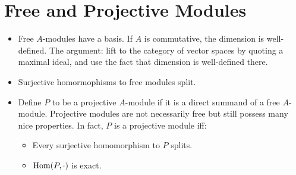 \section{Free and Projective Modules}
\begin{itemize}
    \item Free $A$-modules have a basis. If $A$ is commutative, the dimension is well-defined. The argument: lift to the category of vector spaces by quoting a maximal ideal, and use the fact that dimension is well-defined there.

    \item Surjective homormophisms to free modules split.

    \item Define $P$ to be a projective $A$-module if it is a direct summand of a free $A$-module. Projective modules are not necessarily free but still possess many nice properties. In fact, $P$ is a projective module iff:
        \begin{itemize}
            \item Every surjective homomorphism to $P$ splits.
            \item $\operatorname{Hom}(P, \cdot)$ is exact.
        \end{itemize}
\end{itemize}
